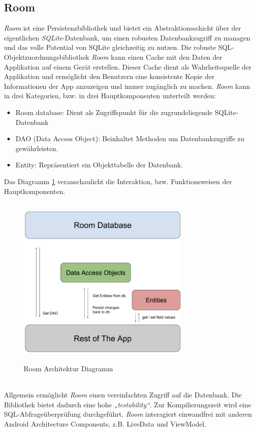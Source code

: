 \subsection*{Room}
\label{sec:Room}
\textit{Room} ist eine Persistenzbibliothek und bietet ein Abstraktionsschicht über der eigentlichen \textit{\acs{SQL}ite}-Datenbank, um einen 
robusten Datenbankzugriff zu managen und das volle Potential von \acs{SQL}ite gleichzeitig zu nutzen. \cite{room.2017}
Die robuste \acs{SQL}-Objektzuordnungsbibliothek \textit{Room} kann einen Cache mit den Daten der Applikation auf einem Gerät erstellen. Dieser 
Cache dient als Wahrheitsquelle der Applikation und ermöglicht den Benutzern eine konsistente Kopie der Informationen der App anzuzeigen 
und immer zugänglich zu machen. \textit{Room} kann in drei Kategorien, bzw. in drei Hauptkomponenten unterteilt werden:
\begin{itemize}
    \item Room database: Dient als Zugriffspunkt für die zugrundeliegende SQLite-Datenbank
    \item DAO (Data Access Object): Beinhaltet Methoden um Datenbankzugriffe zu gewährleisten.
    \item Entity: Repräsentiert ein Objekttabelle der Datenbank.
\end{itemize}
Das Diagramm \ref{pic:roomarchitecturediagramm} veranschaulicht die Interaktion, bzw. Funktionsweisen der Hauptkomponenten.
\begin{figure}[hbt!]
    \centering
    \includegraphics[width=8.5cm,height=8.5cm,keepaspectratio]{2Grundlagen/Bilder/roomArchitecture.png}
    \caption{Room Architektur Diagramm \cite{roomdiagr.2017}}
    \label{pic:roomarchitecturediagramm}
\end{figure} 
\pagebreak
\\
Allgemein ermöglicht \textit{Room} einen vereinfachten Zugriff auf die Datenbank. Die Bibliothek bietet dadurch eine hohe \textit{„testability“}. 
Zur Kompilierungszeit wird eine \acs{SQL}-Abfrageüberprüfung durchgeführt. \textit{Room} interagiert einwandfrei mit anderen Android Architecture 
Components, z.B. LiveData und ViewModel.

